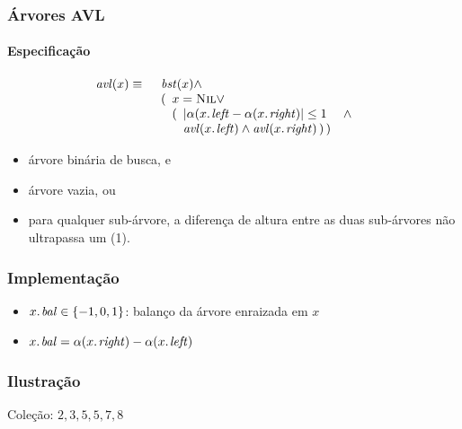 \documentclass{beamer}
\begin{document}
\begin{frame}

\frametitle{Árvores AVL}
\framesubtitle{Especificação}

\begin{eqnarray*}
\id{avl}(x) & \equiv & \begin{array}[t]{l}
\id{bst}(x) \land \\
(\begin{array}[t]{l}
x = \const{Nil} \lor \\
(\begin{array}[t]{ll}
  \left| \alpha(\attrib{x}{left} - \alpha(\attrib{x}{right}) \right| \le 1 & \land \\
  \id{avl}{(\attrib{x}{left}}) \land \id{avl}({\attrib{x}{right}})\, )\, )
\end{array}
\end{array}
\end{array}
\end{eqnarray*}

\begin{itemize}
\item árvore binária de busca, e
\item árvore vazia, ou
\item para qualquer sub-árvore, a diferença de altura entre as duas sub-árvores
  não ultrapassa um (1).
\end{itemize}

\end{frame}

\begin{frame}

\frametitle{Implementação}

\begin{itemize}
\item $\attrib{x}{bal} \in \{-1, 0, 1\}$: balanço da árvore enraizada em $x$
\item $\attrib{x}{bal} = \alpha(\attrib{x}{right}) - \alpha(\attrib{x}{left})$
\end{itemize}

\end{frame}

\begin{frame}

\frametitle{Ilustração}

  Coleção: $2, 3, 5, 5, 7, 8$

  \begin{itemize}
  \end{itemize}

\end{frame}
\end{document}
